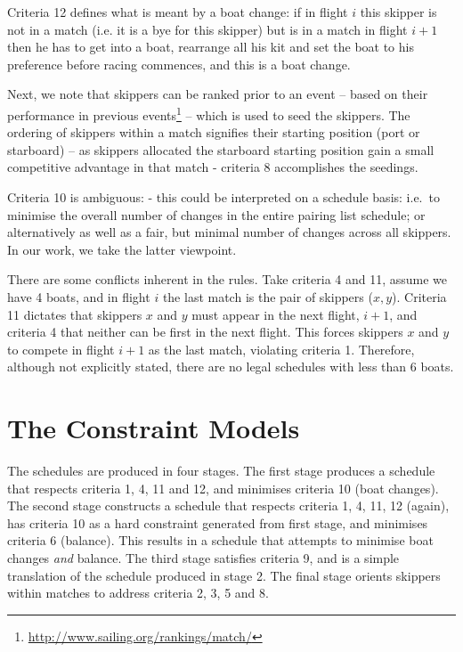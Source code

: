 \documentclass{llncs}
\begin{document}
Criteria 12 defines what is meant by a boat change: if in flight $i$ this skipper is not in a match (i.e. it is a bye for this skipper) but is in a match in flight $i+1$ then he has to get into a boat, rearrange all his kit and set the boat to his preference before racing commences, and this is a boat change.

Next, we note that skippers can be ranked prior to an event -- based on their performance in previous events\footnote{\url{http://www.sailing.org/rankings/match/}} -- which is used to seed the skippers. The ordering of skippers within a match signifies their starting position (port or starboard) -- as skippers allocated the starboard starting position gain a small competitive advantage in that match - criteria 8 accomplishes the seedings.

Criteria 10 is ambiguous: - this could be interpreted on a schedule basis: i.e.\ to minimise the overall number of changes in the entire pairing list schedule; or alternatively as well as a fair, but minimal number of changes across all skippers. In our work, we take the latter viewpoint.

There are some conflicts inherent in the rules. Take criteria 4 and 11, assume we have 4 boats, and in flight $i$ the last match is the pair of skippers ($x,y$). Criteria 11 dictates that skippers $x$ and $y$ must appear in the next flight, $i+1$, and criteria 4 that neither can be first in the next flight. This forces skippers $x$ and $y$ to compete in flight $i+1$ as the last match, violating criteria 1. Therefore, although not explicitly stated, there are no legal schedules with less than 6 boats.

\section{The Constraint Models}\label{sec:models}

The schedules are produced in four stages. The first stage produces a schedule
that respects criteria 1, 4, 11 and 12, and minimises criteria 10 (boat
changes). The second stage constructs a schedule that respects criteria 1, 4,
11, 12 (again), has criteria 10 as a hard constraint generated from first
stage, and minimises criteria 6 (balance). This results in a schedule that
attempts to minimise boat changes \emph{and} balance. The third stage satisfies
criteria 9, and is a simple translation of the schedule produced in stage 2.
The final stage orients skippers within matches to address criteria 2, 3, 5
and 8.
\end{document}
